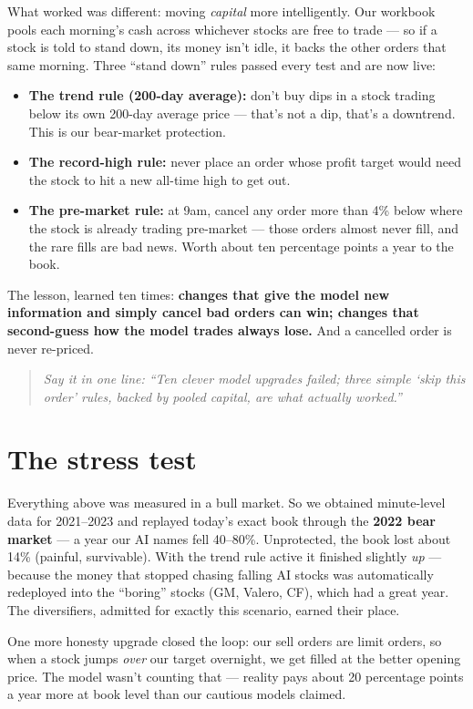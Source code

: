 \documentclass[11pt,a4paper]{article}
\newcommand{\oneline}[1]{\begin{quote}\itshape\color{bcteal}Say it in one line:
``#1''\end{quote}}
\begin{document}
What worked was different: moving \emph{capital} more intelligently. Our
workbook pools each morning's cash across whichever stocks are free to trade
--- so if a stock is told to stand down, its money isn't idle, it backs the
other orders that same morning. Three ``stand down'' rules passed every test
and are now live:

\begin{itemize}
\item \textbf{The trend rule (200-day average):} don't buy dips in a stock
trading below its own 200-day average price --- that's not a dip, that's a
downtrend. This is our bear-market protection.
\item \textbf{The record-high rule:} never place an order whose profit target
would need the stock to hit a new all-time high to get out.
\item \textbf{The pre-market rule:} at 9am, cancel any order more than 4\%
below where the stock is already trading pre-market --- those orders almost
never fill, and the rare fills are bad news. Worth about ten percentage
points a year to the book.
\end{itemize}

The lesson, learned ten times: \textbf{changes that give the model new
information and simply cancel bad orders can win; changes that second-guess
how the model trades always lose.} And a cancelled order is never re-priced.

\oneline{Ten clever model upgrades failed; three simple `skip this order'
rules, backed by pooled capital, are what actually worked.}

\section{The stress test}

Everything above was measured in a bull market. So we obtained minute-level
data for 2021--2023 and replayed today's exact book through the
\textbf{2022 bear market} --- a year our AI names fell 40--80\%. Unprotected,
the book lost about 14\% (painful, survivable). With the trend rule active it
finished slightly \emph{up} --- because the money that stopped chasing falling AI stocks
was automatically redeployed into the ``boring'' stocks (GM, Valero, CF),
which had a great year. The diversifiers, admitted for exactly this scenario,
earned their place.

One more honesty upgrade closed the loop: our sell orders are limit orders,
so when a stock jumps \emph{over} our target overnight, we get filled at the
better opening price. The model wasn't counting that --- reality pays about
20 percentage points a year more at book level than our cautious models
claimed.
\end{document}
